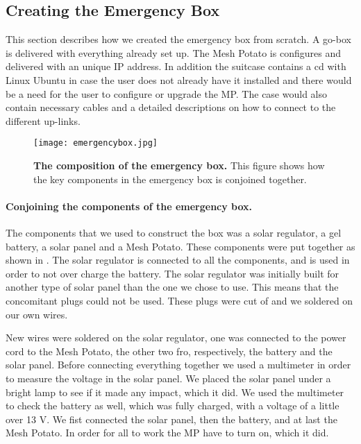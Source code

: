 \subsection{Creating the Emergency Box}
This section describes how we created the emergency box from scratch. A go-box is delivered with everything already set up. The Mesh Potato is configures and delivered with an unique IP address. In addition the suitcase contains a cd with Linux Ubuntu in case the user does not already have it installed and there would be a need for the user to configure or upgrade the MP. The case would also contain necessary cables and a detailed descriptions on how to connect to the different up-links. 

\begin{figure}[t]
  \centering
      \texttt{[image: emergencybox.jpg]}
  \caption [The composition of the emergency box]{\textbf{\textbf{The composition of the emergency box.}} This figure shows how the key components in the emergency box is conjoined together.}
  \label{fig:emergencybox}
\end{figure}

\paragraph{Conjoining the components of the emergency box.}
The components that we used to construct the box was a solar regulator, a gel battery, a solar panel and a Mesh Potato. These components were put together as shown in . The solar regulator is connected to all the components, and is used in order to not over charge the battery. The solar regulator was initially built for another type of solar panel than the one we chose to use. This means that the concomitant plugs could not be used. These plugs were cut of and we soldered on our own wires.  

New wires were soldered on the solar regulator, one was connected to the power cord to the Mesh Potato, the other two fro, respectively, the battery and the solar panel. Before connecting everything together we used a multimeter in order to measure the voltage in the solar panel. We placed the solar panel under a bright lamp to see if it made any impact, which it did. We used the multimeter to check the battery as well, which was fully charged, with a voltage of a little over 13 V. 
We fist connected the solar panel, then the battery, and at last the Mesh Potato. In order for all to work the MP have to turn on, which it did.  

